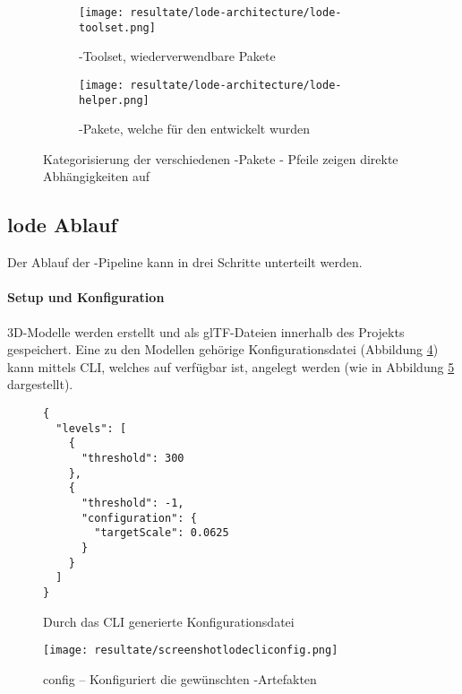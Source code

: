 \begin{figure}[H]
  \begin{subfigure}{.5\textwidth}
    \centering
    \texttt{[image: resultate/lode-architecture/lode-toolset.png]}
    \caption{-Toolset, wiederverwendbare Pakete}
    \label{fig:lodeToolset}
  \end{subfigure}%
  \begin{subfigure}{.5\textwidth}
    \centering
    \texttt{[image: resultate/lode-architecture/lode-helper.png]}
    \caption{-Pakete, welche für den  entwickelt wurden}
    \label{fig:lodeHelper}
  \end{subfigure}
  \caption{Kategorisierung der verschiedenen -Pakete - Pfeile zeigen direkte Abhängigkeiten auf}
  \label{fig:lodePackages}
\end{figure}

\subsection{lode Ablauf}

Der Ablauf der -Pipeline kann in drei Schritte unterteilt werden.

\paragraph{Setup und Konfiguration}
3D-Modelle werden erstellt und als glTF-Dateien innerhalb des Projekts gespeichert. Eine zu den Modellen gehörige Konfigurationsdatei (Abbildung \ref{fig:lodeConfigFile}) kann mittels \gls{CLI}, welches auf  verfügbar ist, angelegt werden (wie in Abbildung \ref{fig:lodecliconfig} dargestellt).

\begin{figure}[H]
  \begin{lstlisting}
{
  "levels": [
    {
      "threshold": 300
    },
    {
      "threshold": -1,
      "configuration": {
        "targetScale": 0.0625
      }
    }
  ]
}
  \end{lstlisting}
\caption{Durch das CLI generierte Konfigurationsdatei}
\label{fig:lodeConfigFile}
\end{figure}

\begin{figure}[H]
  \centering
  \texttt{[image: resultate/screenshotlodecliconfig.png]}
  \caption{ config – Konfiguriert die gewünschten -Artefakten}
  \label{fig:lodecliconfig}
\end{figure}

